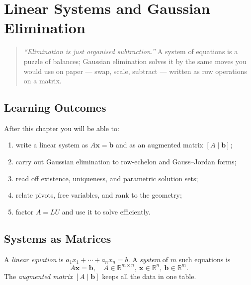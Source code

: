 \chapter{Linear Systems and Gaussian Elimination}
\label{ch:systems}

\begin{quote}
\emph{``Elimination is just organised subtraction.''} A system of equations is a puzzle of balances; Gaussian elimination solves it by the same moves you would use on paper --- swap, scale, subtract --- written as row operations on a matrix.
\end{quote}

\noindent{}
\vspace{0.4em}

\section*{Learning Outcomes}
After this chapter you will be able to:
\begin{enumerate}[label=(L\arabic*)]
    \item write a linear system as $A\mathbf{x}=\mathbf{b}$ and as an augmented matrix $[A\mid\mathbf{b}]$;
    \item carry out Gaussian elimination to row-echelon and Gauss--Jordan forms;
    \item read off existence, uniqueness, and parametric solution sets;
    \item relate pivots, free variables, and rank to the geometry;
    \item factor $A=LU$ and use it to solve efficiently.
\end{enumerate}

\section{Systems as Matrices}
\label{sec:systems-matrix}
A \emph{linear equation} is $a_1x_1+\cdots+a_nx_n=b$. A \emph{system} of $m$ such equations is
\[
  A\mathbf{x}=\mathbf{b},\quad A\in\mathbb{R}^{m\times n},\ \mathbf{x}\in\mathbb{R}^n,\ \mathbf{b}\in\mathbb{R}^m.
\]
The \emph{augmented matrix} $[A\mid\mathbf{b}]$ keeps all the data in one table.

